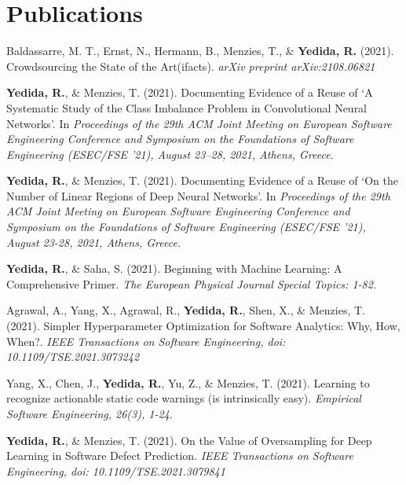 \section{Publications}
 \resumeSubHeadingListStart
    \item
      {Baldassarre, M. T., Ernst, N., Hermann, B., Menzies, T., \& \textbf{Yedida, R.} (2021). Crowdsourcing the State of the Art(ifacts). \textit{arXiv preprint arXiv:2108.06821} 
      }
    \item
      {\textbf{Yedida, R.}, \& Menzies, T. (2021).  Documenting Evidence of a Reuse of ‘A Systematic Study of the Class Imbalance Problem in Convolutional Neural Networks’. In \textit{Proceedings of the 29th ACM Joint Meeting on European Software Engineering Conference and Symposium on the Foundations of Software Engineering (ESEC/FSE ’21), August 23–28, 2021, Athens, Greece.}
      }
    \item
      {\textbf{Yedida, R.}, \& Menzies, T. (2021). Documenting Evidence of a Reuse of ‘On the Number of Linear Regions of Deep Neural Networks’. In \textit{Proceedings of the 29th ACM Joint Meeting on European Software Engineering Conference and Symposium on the Foundations of Software Engineering (ESEC/FSE '21), August 23-28, 2021, Athens, Greece.}
      }
    \item
      {\textbf{Yedida, R.}, \& Saha, S. (2021). Beginning with Machine Learning: A Comprehensive Primer. \textit{The European Physical Journal Special Topics: 1-82.}}
    \item
      {Agrawal, A., Yang, X., Agrawal, R., \textbf{Yedida, R.}, Shen, X., \& Menzies, T. (2021). Simpler Hyperparameter Optimization for Software Analytics: Why, How, When?. \textit{IEEE Transactions on Software Engineering, doi: 10.1109/TSE.2021.3073242}}
    \item
      {Yang, X., Chen, J., \textbf{Yedida, R.}, Yu, Z., \& Menzies, T. (2021). Learning to recognize actionable static code warnings (is intrinsically easy). \textit{Empirical Software Engineering, 26(3), 1-24}.}
    \item
      {\textbf{Yedida, R.}, \& Menzies, T. (2021). On the Value of Oversampling for Deep Learning in Software Defect Prediction. \textit{IEEE Transactions on Software Engineering, doi: 10.1109/TSE.2021.3079841}}
